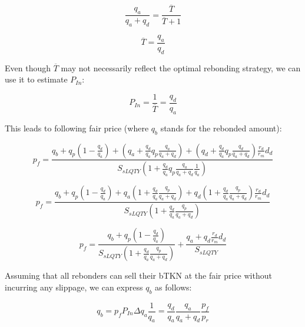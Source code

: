 \documentclass{article}
\begin{document}
\begin{equation}
    \frac{q_{a}}{q_{a}+q_{d}} = \frac{\overline{T}}{\overline{T}+1}
\end{equation}

\begin{equation}
    \overline{T} = \frac{q_{a}}{q_{d}}
\end{equation}

Even though $\overline{T}$ may not necessarily reflect the optimal rebonding strategy, we can use it to estimate $P_{In}$:

\begin{equation}
   P_{In} = \frac{1}{\overline{T}} = \frac{q_{d}}{q_{a}}
\end{equation}

This leads to following fair price (where $q_b$ stands for the rebonded amount):

\begin{equation}
p_{f} = \frac{q_{b}+q_{p} \left(1-\frac{q_{d}}{q_{a}}\right)+\left(q_{a}+\frac{q_{d}}{q_{a}}q_{p}\frac{q_{a}}{q_{a}+q_{d}}\right)+ \left(q_{d}+\frac{q_{d}}{q_{a}}q_{p}\frac{q_{d}}{q_{a}+q_{d}}\right)\frac{r_{d}}{r_{m}}d_{d}}{S_{sLQTY} \left( 1+\frac{q_{d}}{q_{a}} q_{p}\frac{q_{a}}{q_{a}+q_{d}}\frac{1}{q_{a}} \right)}
\end{equation}

\begin{equation}
p_{f} = \frac{q_{b}+q_{p} \left(1-\frac{q_{d}}{q_{a}}\right)+q_{a}\left(1+\frac{q_{d}}{q_{a}}\frac{q_{p}}{q_{a}+q_{d}}\right)+q_{d} \left(1+\frac{q_{d}}{q_{a}}\frac{q_{p}}{q_{a}+q_{d}}\right)\frac{r_{d}}{r_{m}}d_{d}}{S_{sLQTY} \left( 1+\frac{q_{d}}{q_{a}}\frac{q_{p}}{q_{a}+q_{d}} \right)}
\end{equation}

\begin{equation}
p_{f} = \frac{q_{b}+q_{p} \left(1-\frac{q_{d}}{q_{a}}\right)}{S_{sLQTY} \left( 1+\frac{q_{d}}{q_{a}}\frac{q_{p}}{q_{a}+q_{d}} \right)} + \frac{q_{a}+q_{d}\frac{r_{d}}{r_{m}}d_{d}}{S_{sLQTY}}
\end{equation}

Assuming that all rebonders can sell their bTKN at the fair price without incurring any slippage, we can express $q_b$ as follows:

\begin{equation}
q_{b} = p_f P_{In} \Delta q_{a} \frac{1}{q_{a}} = \frac{q_{d}}{q_{a}} \frac{q_{a}}{q_{a}+q_{d}} \frac{p_{f}}{p_{r}}
\end{equation}
\end{document}
